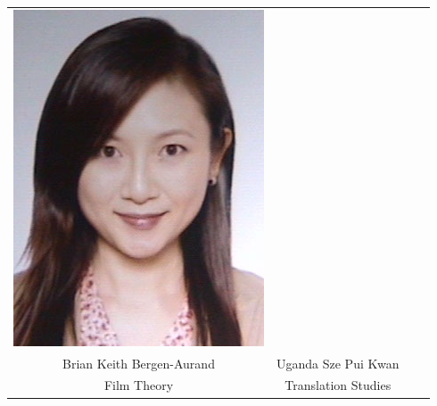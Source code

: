 \documentclass[a4paper,landscape,headrule,footrule,xetex,25pt]{foils}
\begin{document}
\begin{center}
\begin{tabular}{cccc}
    \includegraphics[width=\picwidth]{pics/uganda} \\
    Brian Keith Bergen-Aurand &
    Uganda Sze Pui Kwan & \\
    Film Theory & Translation Studies\\
  \end{tabular}
\end{center}


\end{document}
